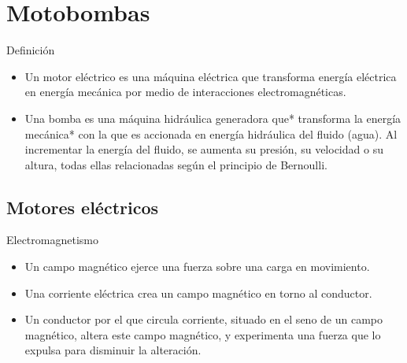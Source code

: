 \documentclass[xcolor={usenames,svgnames,dvipsnames}]{beamer}
\begin{document}
\section{Motobombas}
\label{sec-2}

\begin{frame}[label=sec-2-0-1]{Definición}
\begin{itemize}
\item Un \alert{motor eléctrico} es una máquina eléctrica que \alert{transforma energía
eléctrica en energía mecánica} por medio de interacciones
electromagnéticas.

\item Una \alert{bomba} es una \alert{máquina hidráulica} generadora que* transforma la
energía mecánica* con la que es accionada \alert{en energía hidráulica del
fluido} (agua). Al incrementar la energía del fluido, se aumenta su
presión, su velocidad o su altura, todas ellas relacionadas según el
principio de Bernoulli.
\end{itemize}
\end{frame}

\subsection{Motores eléctricos}
\label{sec-2-1}

\begin{frame}[label=sec-2-1-1]{Electromagnetismo}
\begin{itemize}
\item Un \alert{campo magnético} ejerce una \alert{fuerza} sobre una \alert{carga en
movimiento}.

\item Una \alert{corriente eléctrica crea un campo magnético} en torno al
conductor.

\item Un \alert{conductor por el que circula corriente}, situado \alert{en el seno de
un campo magnético}, altera este campo magnético, y \alert{experimenta una
fuerza} que lo expulsa para \alert{disminuir la alteración}.
\end{itemize}
\end{frame}
\end{document}
